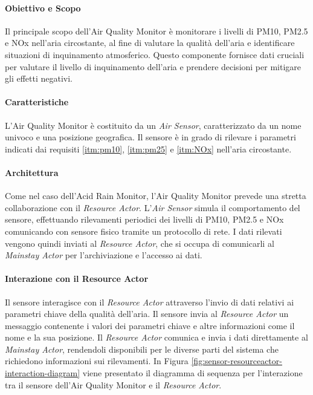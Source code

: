 \documentclass[12pt]{article}
\begin{document}
\paragraph{Obiettivo e Scopo}
Il principale scopo dell'Air Quality Monitor è monitorare i livelli di PM10, PM2.5 e NOx nell'aria circostante, al fine di valutare la qualità dell'aria e identificare situazioni di inquinamento atmosferico. Questo componente fornisce dati cruciali per valutare il livello di inquinamento dell'aria e prendere decisioni per mitigare gli effetti negativi.

\paragraph{Caratteristiche}
L'Air Quality Monitor è costituito da un \textit{Air Sensor}, caratterizzato da un nome univoco e una posizione geografica. Il sensore è in grado di rilevare i parametri indicati dai requisiti \ref{itm:pm10}, \ref{itm:pm25} e \ref{itm:NOx} nell'aria circostante.

\paragraph{Architettura}
Come nel caso dell'Acid Rain Monitor, l'Air Quality Monitor prevede una stretta collaborazione con il \textit{Resource Actor}. L'\textit{Air Sensor} simula il comportamento del sensore, effettuando rilevamenti periodici dei livelli di PM10, PM2.5 e NOx comunicando con sensore fisico tramite un protocollo di rete. I dati rilevati vengono quindi inviati al \textit{Resource Actor}, che si occupa di comunicarli al \textit{Mainstay Actor} per l'archiviazione e l'accesso ai dati.

\paragraph{Interazione con il Resource Actor}
Il sensore interagisce con il \textit{Resource Actor} attraverso l'invio di dati relativi ai parametri chiave della qualità dell'aria. Il sensore invia al \textit{Resource Actor} un messaggio contenente i valori dei parametri chiave e altre informazioni come il nome e la sua posizione. Il \textit{Resource Actor} comunica e invia i dati direttamente al \textit{Mainstay Actor}, rendendoli disponibili per le diverse parti del sistema che richiedono informazioni sui rilevamenti. In Figura \ref{fig:sensor-resourceactor-interaction-diagram} viene presentato il diagramma di sequenza per l'interazione tra il sensore dell'Air Quality Monitor e il \textit{Resource Actor}.
\end{document}
